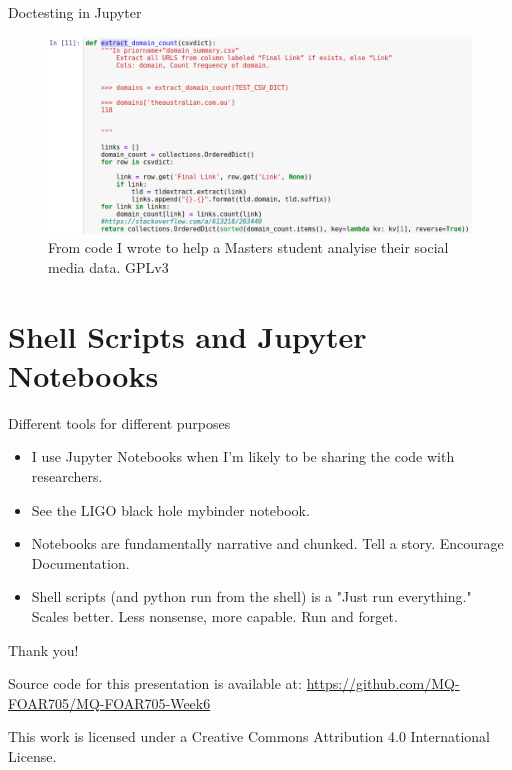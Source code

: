 \documentclass[aspectratio=1610, 11pt]{beamer} %
\begin{document}
\begin{frame}{Doctesting in Jupyter}
\begin{figure}
    \includegraphics[height=.75\textheight]{figures/jupyterDoctest.png}
    \caption{From code I wrote to help a Masters student analyise their social media data. GPLv3}
    \label{fig:analysis}
\end{figure}
\end{frame}
\section{Shell Scripts and Jupyter Notebooks}
\begin{frame}{Different tools for different purposes}
\begin{itemize}[label=\textbullet]
    \item I use Jupyter Notebooks when I'm likely to be sharing the code with researchers.
    \item See the LIGO black hole mybinder notebook.
    \item Notebooks are fundamentally narrative and chunked. Tell a story. Encourage Documentation.
    \item Shell scripts (and python run from the shell) is a "Just run everything." Scales better. Less nonsense, more capable. Run and forget.
\end{itemize}

\end{frame}


\begin{frame}{Thank you!}


Source code for this presentation is available at: \url{https://github.com/MQ-FOAR705/MQ-FOAR705-Week6}

This work is licensed under a Creative Commons Attribution 4.0 International License.

\end{frame}
\end{document}
